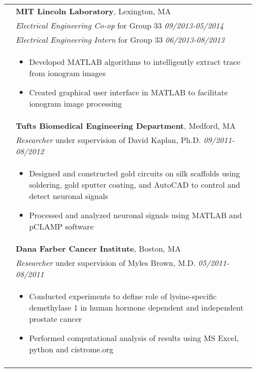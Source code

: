 \documentclass[letterpaper,11pt,oneside]{article}
\begin{document}
\begin{longtable}{@{} p{2.5cm} p{14.8cm}}
& \textbf{MIT Lincoln Laboratory}, Lexington, MA \\*
& \textit{Electrical Engineering Co-op} for Group 33 \hfill \textit{09/2013-05/2014} \\* 
& \textit{Electrical Engineering Intern} for Group 33 \hfill \textit{06/2013-08/2013} \\*
& 
\vspace{-7mm}
\begin{itemize}[leftmargin=.5cm]
	\setlength\itemsep{-0.3em}
	\item Developed MATLAB algorithms to intelligently extract trace from ionogram images
	\item Created graphical user interface in MATLAB to facilitate ionogram image processing
\end{itemize} 
\\

& \textbf{Tufts Biomedical Engineering Department}, Medford, MA \\
& \textit{Researcher} under supervision of David Kaplan, Ph.D. \hfill \textit{09/2011-08/2012} \\ 
& 
\vspace{-7mm}
\begin{itemize}[leftmargin=.5cm]
	\setlength\itemsep{-0.3em}
	\item Designed and constructed gold circuits on silk scaffolds using soldering, gold sputter coating, and AutoCAD to control and detect neuronal signals
	\item Processed and analyzed neuronal signals using MATLAB and pCLAMP software
\end{itemize} 
\\

& \textbf{Dana Farber Cancer Institute}, Boston, MA \\
& \textit{Researcher} under supervision of Myles Brown, M.D. \hfill \textit{05/2011-08/2011} \\ 
& 
\vspace{-7mm}
\begin{itemize}[leftmargin=.5cm]
	\setlength\itemsep{-0.3em}
	\item Conducted experiments to define role of lysine-specific demethylase 1 in human hormone dependent and independent prostate cancer
	\item Performed computational analysis of results using MS Excel, python and cistrome.org
\end{itemize} 
\\
& \\


\end{longtable}
\end{document}
